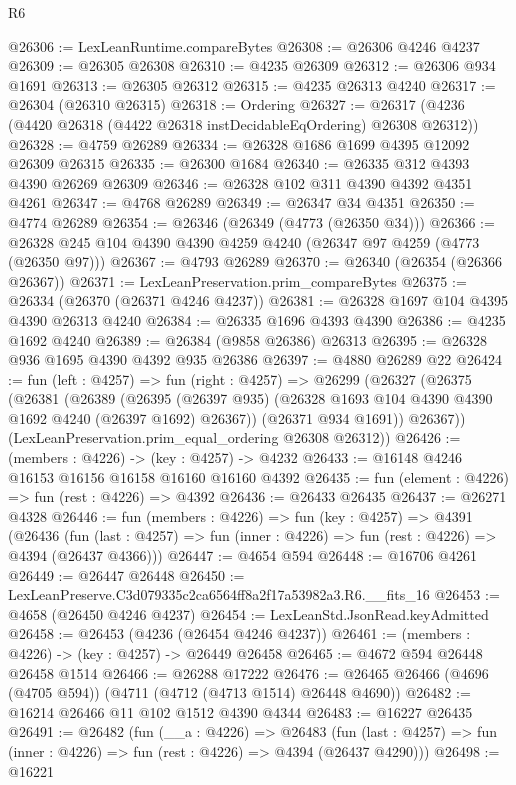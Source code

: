 \begin{lexlean}{R6}
\begin{coremodule}
@26306 := LexLeanRuntime.compareBytes
@26308 := @26306 @4246 @4237
@26309 := @26305 @26308
@26310 := @4235 @26309
@26312 := @26306 @934 @1691
@26313 := @26305 @26312
@26315 := @4235 @26313 @4240
@26317 := @26304 (@26310 @26315)
@26318 := Ordering
@26327 := @26317 (@4236 (@4420 @26318 (@4422 @26318 instDecidableEqOrdering) @26308 @26312))
@26328 := @4759 @26289
@26334 := @26328 @1686 @1699 @4395 @12092 @26309 @26315
@26335 := @26300 @1684
@26340 := @26335 @312 @4393 @4390 @26269 @26309
@26346 := @26328 @102 @311 @4390 @4392 @4351 @4261
@26347 := @4768 @26289
@26349 := @26347 @34 @4351
@26350 := @4774 @26289
@26354 := @26346 (@26349 (@4773 (@26350 @34)))
@26366 := @26328 @245 @104 @4390 @4390 @4259 @4240 (@26347 @97 @4259 (@4773 (@26350 @97)))
@26367 := @4793 @26289
@26370 := @26340 (@26354 (@26366 @26367))
@26371 := LexLeanPreservation.prim_compareBytes
@26375 := @26334 (@26370 (@26371 @4246 @4237))
@26381 := @26328 @1697 @104 @4395 @4390 @26313 @4240
@26384 := @26335 @1696 @4393 @4390
@26386 := @4235 @1692 @4240
@26389 := @26384 (@9858 @26386) @26313
@26395 := @26328 @936 @1695 @4390 @4392 @935 @26386
@26397 := @4880 @26289 @22
@26424 := fun (left : @4257) =>
  fun (right : @4257) =>
  @26299
    (@26327
      (@26375
        (@26381
          (@26389
            (@26395 (@26397 @935) (@26328 @1693 @104 @4390 @4390 @1692 @4240 (@26397 @1692) @26367))
            (@26371 @934 @1691))
          @26367))
      (LexLeanPreservation.prim_equal_ordering @26308 @26312))
@26426 := (members : @4226) -> (key : @4257) -> @4232
@26433 := @16148 @4246 @16153 @16156 @16158 @16160 @16160 @4392
@26435 := fun (element : @4226) => fun (rest : @4226) => @4392
@26436 := @26433 @26435
@26437 := @26271 @4328
@26446 := fun (members : @4226) =>
  fun (key : @4257) =>
  @4391
    (@26436
      (fun (last : @4257) => fun (inner : @4226) => fun (rest : @4226) => @4394 (@26437 @4366)))
@26447 := @4654 @594
@26448 := @16706 @4261
@26449 := @26447 @26448
@26450 := LexLeanPreserve.C3d079335c2ca6564ff8a2f17a53982a3.R6.__fits_16
@26453 := @4658 (@26450 @4246 @4237)
@26454 := LexLeanStd.JsonRead.keyAdmitted
@26458 := @26453 (@4236 (@26454 @4246 @4237))
@26461 := (members : @4226) -> (key : @4257) -> @26449 @26458
@26465 := @4672 @594 @26448 @26458 @1514
@26466 := @26288 @17222
@26476 := @26465 @26466 (@4696 (@4705 @594)) (@4711 (@4712 (@4713 @1514) @26448 @4690))
@26482 := @16214 @26466 @11 @102 @1512 @4390 @4344
@26483 := @16227 @26435
@26491 := @26482
    (fun (__a : @4226) =>
    @26483
      (fun (last : @4257) => fun (inner : @4226) => fun (rest : @4226) => @4394 (@26437 @4290)))
@26498 := @16221

\end{coremodule}
\end{lexlean}
